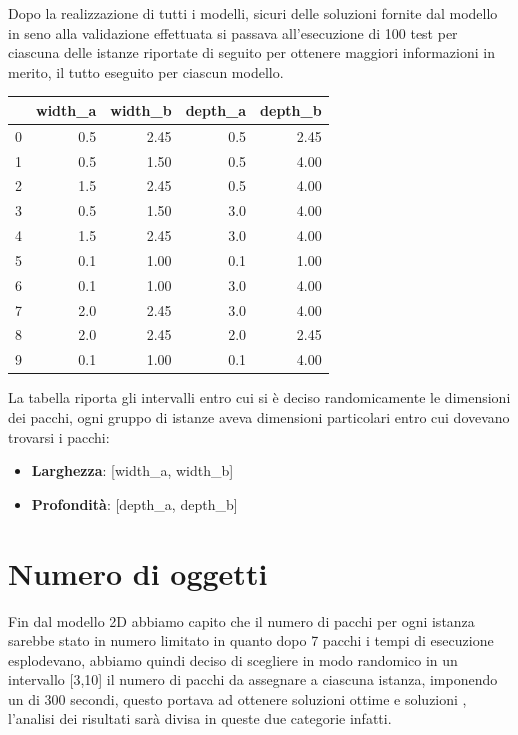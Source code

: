 Dopo la realizzazione di tutti i modelli, sicuri delle soluzioni fornite dal modello in seno alla validazione effettuata si passava all'esecuzione di 100 test per ciascuna delle istanze riportate di seguito per ottenere maggiori informazioni in merito, il tutto eseguito per ciascun modello.
\begin{center}
	\begin{tabular}{lrrrr}
		\toprule
		{} & width\_a & width\_b & depth\_a & depth\_b \\
		\midrule
		0  & 0.5      & 2.45     & 0.5      & 2.45     \\
		1  & 0.5      & 1.50     & 0.5      & 4.00     \\
		2  & 1.5      & 2.45     & 0.5      & 4.00     \\
		3  & 0.5      & 1.50     & 3.0      & 4.00     \\
		4  & 1.5      & 2.45     & 3.0      & 4.00     \\
		5  & 0.1      & 1.00     & 0.1      & 1.00     \\
		6  & 0.1      & 1.00     & 3.0      & 4.00     \\
		7  & 2.0      & 2.45     & 3.0      & 4.00     \\
		8  & 2.0      & 2.45     & 2.0      & 2.45     \\
		9  & 0.1      & 1.00     & 0.1      & 4.00     \\
		\bottomrule
	\end{tabular}
\end{center}

La tabella riporta gli intervalli entro cui si è deciso randomicamente le dimensioni dei pacchi, ogni gruppo di istanze aveva dimensioni particolari entro cui dovevano trovarsi i pacchi:
\begin{itemize}
	\item \textbf{Larghezza}: [width\_a, width\_b]
	\item \textbf{Profondità}: [depth\_a, depth\_b]
\end{itemize}

\section{Numero di oggetti}
Fin dal modello 2D abbiamo capito che il numero di pacchi per ogni istanza sarebbe stato in numero limitato in quanto dopo 7 pacchi i tempi di esecuzione esplodevano, abbiamo quindi deciso di scegliere in modo randomico in un intervallo [3,10] il numero di pacchi da assegnare a ciascuna istanza, imponendo un  di 300 secondi, questo portava ad ottenere soluzioni ottime e soluzioni , l'analisi dei risultati sarà divisa in queste due categorie infatti.

